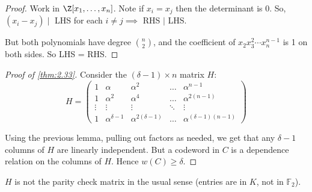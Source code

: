 \documentclass{article}
\newcommand{\F}{\mathbb{F}}
\newcommand{\1}[1]{\mathbbm{1}_{#1}}
\begin{document}
\begin{proof}
    Work in $\Z[x_1, \dotsc, x_n]$. Note if $x_i = x_j$ then the determinant is 0.
    So, $(x_i - x_j) \mid $ LHS for each $i \neq j \implies $ RHS $\mid$ LHS.

    But both polynomials have degree $\binom{n}{2}$, and the coefficient of $x_2 x_3^2 \dotsm x_n^{n-1}$ is 1 on both sides. So LHS = RHS.
\end{proof}
\begin{proof}[Proof of \cref{thm:2.33}]
    Consider the $(\delta-1) \times n$ matrix $H$:
    \begin{equation*}
        H =
        \begin{pmatrix}
            1 & \alpha & \alpha^2 & \dots & \alpha^{n-1} \\
            1 & \alpha^2 & \alpha^4 & \dots & \alpha^{2(n-1)} \\
            \vdots & \vdots & \vdots & \ddots & \vdots \\
            1 & \alpha^{\delta-1} & \alpha^{2(\delta-1)} & \dots & \alpha^{(\delta-1)(n-1)}
        \end{pmatrix}
    \end{equation*}

    Using the previous lemma, pulling out factors as needed, we get that any $\delta-1$ columns of $H$ are linearly independent.
    But a codeword in $C$ is a dependence relation on the columns of $H$. Hence $w(C) \geq \delta$.
\end{proof}
\begin{remark}
    $H$ is not the parity check matrix in the usual sense (entries are in $K$, not in $\F_2$).
\end{remark}
\end{document}
